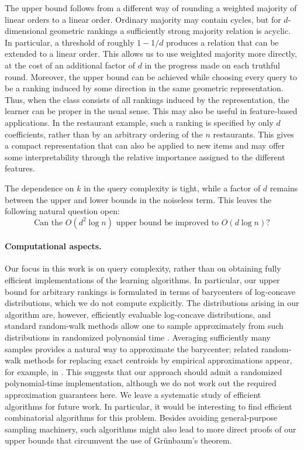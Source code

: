 \documentclass[11pt]{article}
\theoremstyle{definition}
\theoremstyle{remark}
\begin{document}
The upper bound follows from a different way of rounding a weighted majority
of linear orders to a linear order. Ordinary majority may contain cycles, but for
$d$-dimensional geometric rankings a sufficiently strong majority relation
is acyclic. In particular, a threshold of roughly $1-1/d$ produces a
relation that can be extended to a linear order. This allows us to use
weighted majority more directly, at the cost of an additional factor of $d$
in the progress made on each truthful round.
Moreover, the upper bound can be achieved while choosing every query to be
a ranking induced by some direction in the same geometric representation.
Thus, when the class consists of all rankings induced by the representation,
the learner can be proper in the usual sense. This may also be useful in
feature-based applications. In the restaurant example, such a ranking is
specified by only $d$ coefficients, rather than by an arbitrary ordering
of the $n$ restaurants. This gives a compact representation that can also be
applied to new items and may offer some interpretability through the relative
importance assigned to the different features.

The dependence on $k$ in the query complexity is tight, while a factor of $d$ remains
between the upper and lower bounds in the noiseless term. This leaves the
following natural question open:
\[
    \text{Can the } O(d^2\log n) \text{ upper bound be improved to }
    O(d\log n)\text{?}
\]


\paragraph{Computational aspects.}
Our focus in this work is on query complexity, rather than on obtaining
fully efficient implementations of the learning algorithms. In particular,
our upper bound for arbitrary rankings is formulated in terms of barycenters
of log-concave distributions, which we do not compute explicitly. The
distributions arising in our algorithm are, however, efficiently evaluable
log-concave distributions, and standard random-walk methods allow one to
sample approximately from such distributions in randomized polynomial time
\cite{LovaszVempala2006,LovaszVempala2007}. Averaging sufficiently many
samples provides a natural way to approximate the barycenter; related
random-walk methods for replacing exact centroids by empirical
approximations appear, for example, in \cite{BertsimasVempala2004}.
This suggests that our approach should admit a randomized polynomial-time
implementation, although we do not work out the required approximation
guarantees here. We leave a systematic study of efficient algorithms for
future work. In particular, it would be interesting to find efficient
combinatorial algorithms for this problem. Besides avoiding general-purpose
sampling machinery, such algorithms might also lead to more direct proofs
of our upper bounds that circumvent the use of Gr\"unbaum's theorem.
\end{document}
